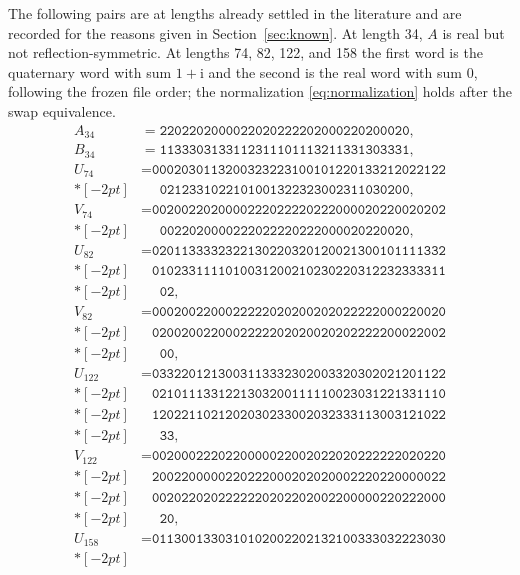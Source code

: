 \documentclass[11pt]{article}
\newcommand{\ii}{\mathrm{i}}
\begin{document}
The following pairs are at lengths already settled in the literature and are
recorded for the reasons given in Section~\ref{sec:known}.  At length 34, $A$
is real but not reflection-symmetric.  At lengths 74, 82, 122, and 158 the
first word is the quaternary word with sum $1+\ii$ and the second is the real
word with sum $0$, following the frozen file order; the normalization
\eqref{eq:normalization} holds after the swap equivalence.
\begin{align*}
A_{34}&=\texttt{2202202000022020222202000220200020},\\
B_{34}&=\texttt{1133303133112311101113211331303331},\\[2pt]
U_{74}&=\texttt{0002030113200323223100101220133212022122}\\*[-2pt]
      &\phantom{{}={}}\texttt{0212331022101001322323002311030200},\\
V_{74}&=\texttt{0020022020000222022220222000020220020202}\\*[-2pt]
      &\phantom{{}={}}\texttt{0022020000222022220222000020220020},\\[2pt]
U_{82}&=\texttt{0201133332322130220320120021300101111332}\\*[-2pt]
      &\phantom{{}={}}\texttt{0102331111010031200210230220312232333311}\\*[-2pt]
      &\phantom{{}={}}\texttt{02},\\
V_{82}&=\texttt{0002002200022222020200202022222000220020}\\*[-2pt]
      &\phantom{{}={}}\texttt{0200200220002222202020020202222200022002}\\*[-2pt]
      &\phantom{{}={}}\texttt{00},\\[2pt]
U_{122}&=\texttt{0332201213003113332302003320302021201122}\\*[-2pt]
      &\phantom{{}={}}\texttt{0210111331221303200111110023031221331110}\\*[-2pt]
      &\phantom{{}={}}\texttt{1202211021202030233002032333113003121022}\\*[-2pt]
      &\phantom{{}={}}\texttt{33},\\
V_{122}&=\texttt{0020002220220000022002022020222222020220}\\*[-2pt]
      &\phantom{{}={}}\texttt{2002200000220222000202020002220220000022}\\*[-2pt]
      &\phantom{{}={}}\texttt{0020220202222220202202002200000220222000}\\*[-2pt]
      &\phantom{{}={}}\texttt{20},\\[2pt]
U_{158}&=\texttt{0113001330310102002202132100333032223030}\\*[-2pt]

\end{align*}
\end{document}
